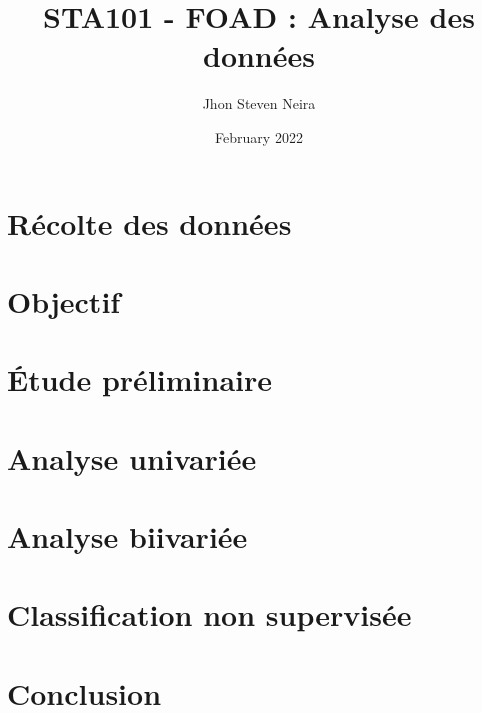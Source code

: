 \documentclass[12pt, a4paper]{article}
\title{STA101 - FOAD : Analyse des données}
\author{Jhon Steven Neira}
\date{February 2022}
\begin{document}
  
\maketitle
  
\tableofcontents

\section{Récolte des  données }


\section{Objectif}






\section{Étude préliminaire}



\section{Analyse univariée}



\section{Analyse biivariée}



\section{Classification non supervisée }


\section{Conclusion }


         
\end{document}

